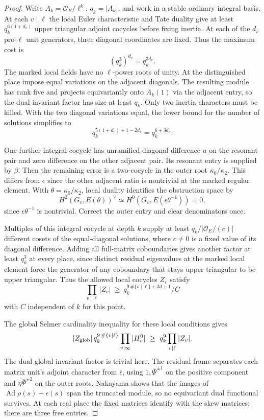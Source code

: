 \begin{proof}
Write \(A_k=\mathcal O_E/\ell^k\), \(q_k=|A_k|\), and work
in a stable ordinary integral basis. At each \(v\mid\ell\)
the local Euler characteristic and Tate duality give at least
\(q_k^{6(1+d_v)}\) upper triangular adjoint cocycles before
fixing inertia. At each of the \(d_v\) pro-\(\ell\) unit generators, three diagonal coordinates are fixed. Thus the maximum cost is
\[
 (q_k^3)^{d_v}=q_k^{3d_v}.
\]
The marked local fields have no \(\ell\)-power roots of unity.
At the distinguished place impose equal variations on the
adjacent diagonals. The resulting module has rank five and
projects equivariantly onto \(A_k(1)\) via the adjacent entry,
so the dual invariant factor has size at least \(q_k\). Only
two inertia characters must be killed. With the two diagonal variations equal, the lower bound for the number of solutions simplifies to
\[
 q_k^{5(1+d_v)+1-2d_v}=q_k^{6+3d_v}.
\]

One further integral cocycle has unramified diagonal difference
\(u\) on the resonant pair and zero difference on the other
adjacent pair. Its resonant entry is supplied by \(\beta\). Then
the remaining error is a two-cocycle in the outer root
\(\kappa_0/\kappa_2\). This differs from \(\epsilon\)
since the other adjacent ratio is nontrivial at the marked
regular element. With \(\theta=\kappa_0/\kappa_2\), local duality identifies the obstruction space by 
\[
 H^2(G_v,E(\theta))^\vee\simeq H^0(G_v,E(\epsilon\theta^{-1}))=0,
\]
 since \(\epsilon\theta^{-1}\) is nontrivial. Correct the outer entry and clear denominators
once.

Multiples of this integral cocycle at depth \(k\)
supply at least \(q_k/|\mathcal O_E/(c)|\) different cosets
of the equal-diagonal solutions, where \(c\ne0\) is a fixed
value of its diagonal difference. Adding all full-matrix
coboundaries gives another factor at least \(q_k^3\) at
every place, since distinct residual eigenvalues at the
marked local element force the generator of any coboundary
that stays upper triangular to be upper triangular. Thus
the allowed local cocycles \(Z_v\) satisfy
\[
  \prod_{v\mid\ell}|Z_v|
        \ \ge\ q_k^{9\,\#\{v\mid\ell\}+3d+1}/C
\]
with \(C\) independent of \(k\) for this point.

The global Selmer cardinality inequality for these local
conditions gives
\[
 |Z_{\rm glob}|\, q_k^{9\,\#\{v\mid\ell\}}
             \prod_{v\mid\infty}|H^0_v|
      \ \ge\ q_k^9\prod_{v\mid\ell}|Z_v| .
\]
The dual global invariant factor is trivial here. The
residual frame separates each matrix unit's adjoint character
from \(\bar\epsilon\), using \(1,\bar\Psi^{\pm1}\) on the
positive component and \(\eta\bar\Psi^{\pm2}\) on the outer
roots. Nakayama shows that the images of
\(\operatorname{Ad}\rho(s)-\epsilon(s)\) span the truncated
module, so no equivariant dual functional survives. At each real place the fixed matrices identify with the skew matrices; there are three free entries.


\end{proof}

